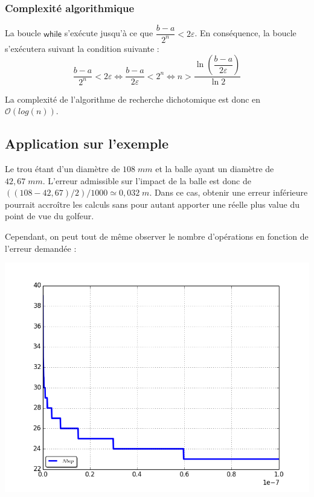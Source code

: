 \documentclass[10pt]{article}
\begin{document}
\subsubsection{Complexité algorithmique}

La boucle $\textsf{while}$ s'exécute jusqu'à ce que $\dfrac{b-a}{2^n}<2\varepsilon$. En conséquence, la boucle s'exécutera suivant la condition suivante : 
$$\dfrac{b-a}{2^n}<2\varepsilon 
\Longleftrightarrow
\dfrac{b-a}{2\varepsilon}<2^n
\Longleftrightarrow
n> \dfrac{\ln\left(\dfrac{b-a}{2\varepsilon}\right)}{\ln 2}$$

La complexité de l'algorithme de recherche dichotomique est donc en $\mathcal{O}(log(n))$.

\subsection{Application sur l'exemple}


\begin{minipage}[c]{.49\linewidth}
Le trou étant d'un diamètre de $108\;mm$ et la balle ayant un diamètre de $42,67\; mm$. L'erreur admissible sur l'impact de la balle est donc de $((108-42,67)/2)/1000 \simeq 0,032\; m$. Dans ce cas, obtenir une erreur inférieure pourrait accroître les calculs sans pour autant apporter une réelle plus value du point de vue du golfeur.

Cependant, on peut tout de même observer le nombre d'opérations en fonction de l'erreur demandée :
\end{minipage}\hfill
\begin{minipage}[c]{.49\linewidth} 
\begin{center}
\includegraphics[width=.9\textwidth]{images/courbe_erreur_dicho}
\end{center}
\end{minipage}
\end{document}
